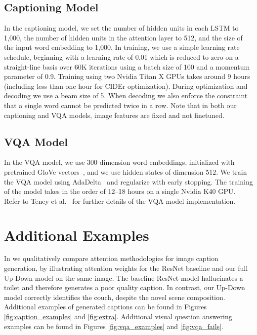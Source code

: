 \documentclass[10pt,twocolumn,letterpaper]{article}
\begin{document}
\subsection{Captioning Model}

In the captioning model, we set the number of hidden units  in each LSTM to 1,000, the number of hidden units  in the attention layer to 512, and the size of the input word embedding  to 1,000. In training, we use  a simple learning rate schedule, beginning with a learning rate of 0.01 which is reduced to zero on a straight-line basis over 60K iterations using a batch size of 100 and a momentum parameter of 0.9. Training using two Nvidia Titan X GPUs takes around 9 hours (including less than one hour for CIDEr optimization). During optimization and decoding we use a beam size of 5. When decoding we also enforce the constraint that a single word cannot be predicted twice in a row. Note that in both our captioning and VQA models, image features are fixed and not finetuned. 

\subsection{VQA Model}

In the VQA model, we use 300 dimension word embeddings, initialized with pretrained GloVe vectors~\cite{pennington2014glove}, and we use hidden states of dimension 512. We train the VQA model using AdaDelta~\cite{zeiler2012adadelta} and regularize with early stopping. The training of the model takes in the order of 12--18 hours on a single Nvidia K40 GPU. Refer to Teney et al.~\cite{teney2017tips} for further details of the VQA model implementation.


\section{Additional Examples}

In  we qualitatively compare attention methodologies for image caption generation, by illustrating attention weights for the ResNet baseline and our full Up-Down model on the same image. The baseline ResNet model hallucinates a toilet and therefore generates a poor quality caption. In contrast, our Up-Down model correctly identifies the couch, despite the novel scene composition. Additional examples of generated captions can be found in Figures \ref{fig:caption_examples} and \ref{fig:extra}. Additional visual question answering examples can be found in Figures \ref{fig:vqa_examples} and \ref{fig:vqa_fails}.
\end{document}
